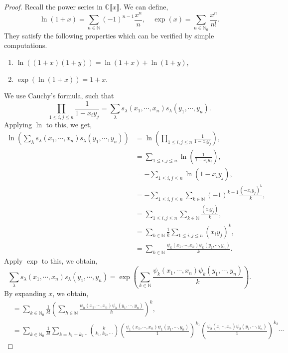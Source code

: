 \documentclass[10pt]{article}
\numberwithin{equation}{theorem}
\newcommand{\N}[0]{\mathbb{N}}
\newcommand{\C}[0]{\mathbb{C}}
\begin{document}
\begin{proof}
  Recall the power series in $\C\llbracket x\rrbracket$. We can define,
  \begin{equation*}
    \ln(1+x) = \sum_{n\in \N}(-1)^{n-1}{\frac {x^n} n},\quad \exp(x) = \sum_{n\in\N_0}{\frac {x^n} {n!}}.
  \end{equation*}
  They satisfy the following properties which can be verified by simple computations.
  \begin{enumerate}[1).]
    \item $\ln((1+x)(1+y)) = \ln(1+x)+\ln(1+y)$,
    \item $\exp(\ln(1+x)) = 1+x$.
  \end{enumerate}
  We use Cauchy's formula, such that 
  \begin{equation*}
    \prod_{1\leq i,j\leq n}{\frac 1 {1-{x_iy_j}}} = \sum_{\lambda}s_\lambda(x_1,\cdots,x_n)s_\lambda(y_1,\cdots,y_n).
  \end{equation*}
  Applying $\ln$ to this, we get,
  \begin{align*}
    \ln\left(\sum_{\lambda} s_\lambda(x_1,\cdots,x_n)s_\lambda(y_1,\cdots,y_n)\right) & = \ln\left(\prod_{1\leq i,j\leq n}{\frac 1 {1-x_iy_j}}\right),\\
    & = \sum_{1\leq i,j\leq n}\ln\left({\frac 1 {1-x_iy_j}}\right),\\
    & = -\sum_{1\leq i,j\leq n}\ln\left(1-x_iy_j\right),\\
    & = -\sum_{1\leq i,j\leq n} \sum_{k\in\N}(-1)^{k-1}{\frac {(-x_iy_j)^k} {k}},\\
    & = \sum_{1\leq i,j\leq n}\sum_{k\in\N} {\frac {(x_iy_j)} k}, \\
    & = \sum_{k\in\N}{\frac 1 k}\sum_{1\leq i,j\leq n}(x_iy_j)^k,\\
    &= \sum_{k\in\N}{\frac {\psi_k(x_1,\cdots,x_n)\psi_k(y_1,\cdots,y_n)} {k}}.
  \end{align*}
  Apply $\exp$ to this, we obtain,
  \begin{equation*}
    \sum_{\lambda}s_\lambda(x_1,\cdots,x_n)s_\lambda(y_1,\cdots,y_n) = \exp\left(\sum_{k\in\N}{\frac {\psi_k(x_1,\cdots,x_n)\psi_k(y_1,\cdots,y_n)} {k}}\right).
  \end{equation*}
  By expanding $x$, we obtain,
  \begin{align*}
    &=\sum_{k\in\N_0}{\frac 1 {k!}}\left(\sum_{h\in\N}{\frac {\psi_h(x_1,\cdots,x_n)\psi_h(y_1,\cdots,y_n)} {h}}\right)^k,\\
    &= \sum_{k\in\N_0}{\frac 1 {k!}}\sum_{k=k_1+k_2\cdots}{k\choose k_1,k_2,\cdots}\left({\frac {\psi_1(x_1,\cdots,x_n)\psi_1(y_1,\cdots,y_n)} {1}}\right)^{k_1}\left({\frac {\psi_2(x_,\cdots,x_n)\psi_2(y_1,\cdots,y_n)} {1}}\right)^{k_2}\cdots

\end{align*}
\end{proof}
\end{document}

